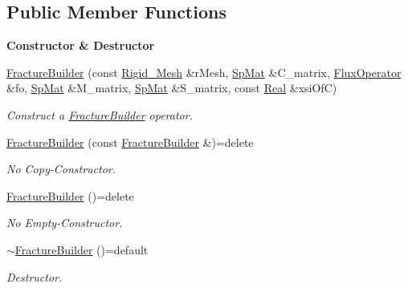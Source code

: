 \subsection*{Public Member Functions}
\begin{Indent}{\bf Constructor \& Destructor}\par
\begin{DoxyCompactItemize}
\item 
\hyperlink{classFVCode3D_1_1FractureBuilder_aa97ba17fc7b3502bcab47957c623ecb0}{Fracture\+Builder} (const \hyperlink{classFVCode3D_1_1Rigid__Mesh}{Rigid\+\_\+\+Mesh} \&r\+Mesh, \hyperlink{namespaceFVCode3D_ac1032289d96638cf0ad6c52ef639095f}{Sp\+Mat} \&C\+\_\+matrix, \hyperlink{classFVCode3D_1_1FluxOperator}{Flux\+Operator} \&fo, \hyperlink{namespaceFVCode3D_ac1032289d96638cf0ad6c52ef639095f}{Sp\+Mat} \&M\+\_\+matrix, \hyperlink{namespaceFVCode3D_ac1032289d96638cf0ad6c52ef639095f}{Sp\+Mat} \&S\+\_\+matrix, const \hyperlink{namespaceFVCode3D_a40c1f5588a248569d80aa5f867080e83}{Real} \&xsi\+OfC)
\begin{DoxyCompactList}\small\item\em Construct a \hyperlink{classFVCode3D_1_1FractureBuilder}{Fracture\+Builder} operator. \end{DoxyCompactList}\item 
\hyperlink{classFVCode3D_1_1FractureBuilder_a9d884485790af58c3aabbdf9698d3cdd}{Fracture\+Builder} (const \hyperlink{classFVCode3D_1_1FractureBuilder}{Fracture\+Builder} \&)=delete
\begin{DoxyCompactList}\small\item\em No Copy-\/\+Constructor. \end{DoxyCompactList}\item 
\hyperlink{classFVCode3D_1_1FractureBuilder_aadd70066f6b2ca44a05e90fa84248838}{Fracture\+Builder} ()=delete
\begin{DoxyCompactList}\small\item\em No Empty-\/\+Constructor. \end{DoxyCompactList}\item 
\hyperlink{classFVCode3D_1_1FractureBuilder_adc351b64e34bcea6893cac2831466e50}{$\sim$\+Fracture\+Builder} ()=default
\begin{DoxyCompactList}\small\item\em Destructor. \end{DoxyCompactList}\end{DoxyCompactItemize}
\end{Indent}
